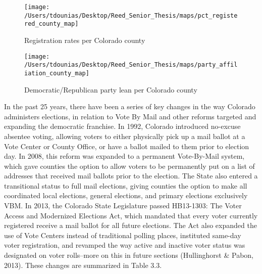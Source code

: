 \documentclass[12pt,twoside]{reedthesis}
\begin{document}
  \begin{figure}
  
  {\centering \texttt{[image: /Users/tdounias/Desktop/Reed\_Senior\_Thesis/maps/pct\_registered\_county\_map]} 
  
  }
  
  \caption[Registration rates per Colorado county]{Registration rates per Colorado county}\label{fig:reg per county map}
  \end{figure}
  
  \begin{figure}
  
  {\centering \texttt{[image: /Users/tdounias/Desktop/Reed\_Senior\_Thesis/maps/party\_affiliation\_county\_map]} 
  
  }
  
  \caption[Democratic/Republican party lean per Colorado county]{Democratic/Republican party lean per Colorado county}\label{fig:party reg per county map}
  \end{figure}
  
  In the past 25 years, there have been a series of key changes in the way
  Colorado administers elections, in relation to Vote By Mail and other
  reforms targeted and expanding the democratic franchise. In 1992,
  Colorado introduced no-excuse absentee voting, allowing voters to either
  physically pick up a mail ballot at a Vote Center or County Office, or
  have a ballot mailed to them prior to election day. In 2008, this reform
  was expanded to a permanent Vote-By-Mail system, which gave counties the
  option to allow voters to be permanently put on a list of addresses that
  received mail ballots prior to the election. The State also entered a
  transitional status to full mail elections, giving counties the option
  to make all coordinated local elections, general elections, and primary
  elections exclusively VBM. In 2013, the Colorado State Legislature
  passed HB13-1303: The Voter Access and Modernized Elections Act, which
  mandated that every voter currently registered receive a mail ballot for
  all future elections. The Act also expanded the use of Vote Centers
  instead of traditional polling places, instituted same-day voter
  registration, and revamped the way active and inactive voter status was
  designated on voter rolls--more on this in future sections (Hullinghorst
  \& Pabon, 2013). These changes are summarized in Table 3.3.
  
  \clearpage
  
\end{document}
